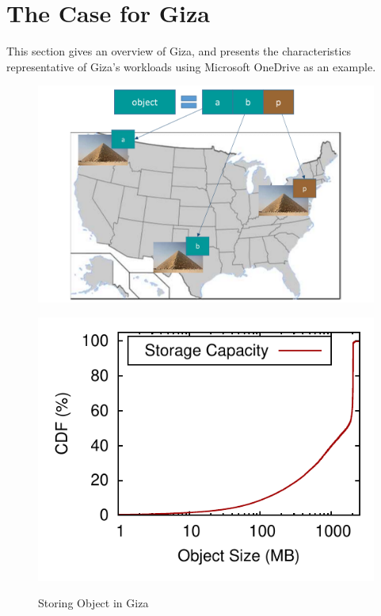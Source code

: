 \section{The Case for Giza}
\label{sec:motivation}

This section gives an overview of Giza, and presents the characteristics
representative of Giza's workloads using Microsoft OneDrive as an example.


\begin{figure}[htp]
\centering
\begin{minipage}{0.3\textwidth}%
\centering
\includegraphics[width=\textwidth]{images/giza_example_crop_fit}
\caption{Storing Object in Giza}
\label{fig:giza_example}
\end{minipage}%
\begin{minipage}{0.7\textwidth}%
\captionsetup{type=figure}
\centering
		\hspace{-1.5em}
    \subcaptionbox{\label{fig:object_size-storage_capacity}}
      {\includegraphics[height=0.275\textwidth]{data/object_size-storage_capacity}}%

\end{minipage}
\end{figure}
